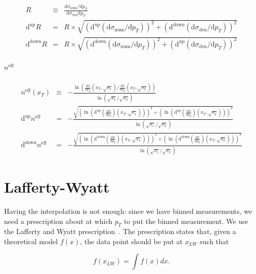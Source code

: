 \documentclass[a4paper,10pt]{article}
\newcommand{\xt}{\ensuremath{x_T}\xspace}
\newcommand{\pt}{\ensuremath{p_T}\xspace}
\newcommand{\dd}{\ensuremath{\text{d}}\xspace}
\begin{document}
 \begin{eqnarray}
  R & \equiv & \frac{\dd \sigma_\text{num} / \dd \pt}{\dd \sigma_\text{den} \dd \pt}\\
  \dd^\text{up} R & = & R \times \sqrt{(\dd^\text{up} \left(\dd \sigma_\text{num}/\dd\pt\right))^2 + (\dd^\text{down} \left(\dd \sigma_\text{den}/\dd\pt\right))^2} \\
  \dd^\text{down} R & = & R \times \sqrt{(\dd^\text{down} \left(\dd \sigma_\text{num}/\dd\pt\right))^2 + (\dd^\text{up} \left(\dd \sigma_\text{den}/\dd\pt\right))^2}
 \end{eqnarray}
 
 \paragraph{$n^\text{eff}$}
 
 \begin{eqnarray}
  n^\text{eff} (\xt) & \equiv & - \frac{\ln \left(\frac{\dd \sigma}{\dd \pt}(\xt, \sqrt{s_1}) / \frac{\dd \sigma}{\dd \pt}(\xt, \sqrt{s_2}) \right)}{\ln\left(\sqrt{s_1}/\sqrt{s_2}\right)}\\
  \dd^\text{up} n^\text{eff} & = & -\frac{\sqrt{\left(\ln \left(\dd^\text{up} \left(\frac{\dd \sigma}{\dd \pt}\right)(\xt, \sqrt{s_1})\right)\right)^2 
  +\left(\ln \left(\dd^\text{up} \left(\frac{\dd \sigma}{\dd \pt}\right)(\xt, \sqrt{s_2})\right)\right)^2 }}{\ln\left(\sqrt{s_1}/\sqrt{s_2}\right)} \\
  \dd^\text{down} n^\text{eff} & = & -\frac{\sqrt{\left(\ln \left(\dd^\text{down} \left(\frac{\dd \sigma}{\dd \pt}\right)(\xt, \sqrt{s_1})\right)\right)^2 
  +\left(\ln \left(\dd^\text{down} \left(\frac{\dd \sigma}{\dd \pt}\right)(\xt, \sqrt{s_2})\right)\right)^2 }}{\ln\left(\sqrt{s_1}/\sqrt{s_2}\right)} 
 \end{eqnarray}
 


 \section{Lafferty-Wyatt}
 Having the interpolation is not enough: since we have binned measurements, we need a prescription about at which \pt to put the binned measurement. We use the Lafferty and Wyatt prescription~\cite{lw}. The prescription states that, given a theoretical model $f(x)$, the data point should be put at $x_{LW}$ such that 
 
 \begin{equation}
  f(x_{LW}) = \int f(x) dx.
 \end{equation}
\end{document}
